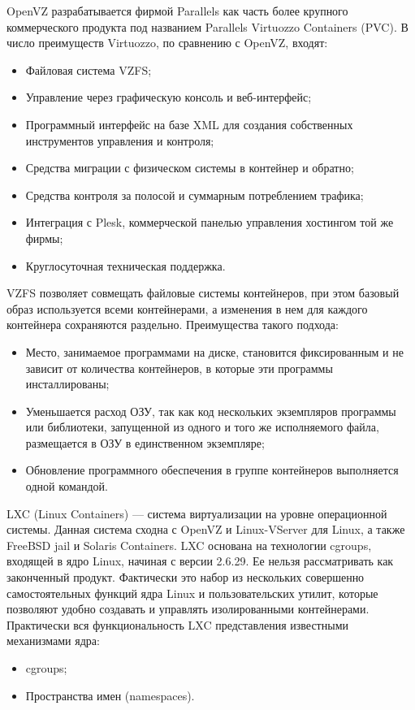 OpenVZ разрабатывается фирмой Parallels как часть более крупного коммерческого продукта под названием Parallels Virtuozzo Containers (PVC). В число преимуществ Virtuozzo, по сравнению с OpenVZ, входят:
\begin{itemize}
  \item Файловая система VZFS;
  \item Управление через графическую консоль и веб-интерфейс;
  \item Программный интерфейс на базе XML для создания собственных инструментов управления и контроля;
  \item Средства миграции с физическом системы в контейнер и обратно;
  \item Средства контроля за полосой и суммарным потреблением трафика;
  \item Интеграция с Plesk, коммерческой панелью управления хостингом той же фирмы;
  \item Круглосуточная техническая поддержка.
\end{itemize}

VZFS позволяет совмещать файловые системы контейнеров, при этом базовый образ используется всеми контейнерами, а изменения в нем для каждого контейнера сохраняются раздельно.
Преимущества такого подхода:
\begin{itemize}
  \item Место, занимаемое программами на диске, становится фиксированным и не зависит от количества контейнеров, в которые эти программы инсталлированы;
  \item Уменьшается расход ОЗУ, так как код нескольких экземпляров программы или библиотеки, запущенной из одного и того же исполняемого файла, размещается в ОЗУ в единственном экземпляре;
  \item Обновление программного обеспечения в группе контейнеров выполняется одной командой.
\end{itemize}

LXC (Linux Containers) --- система виртуализации на уровне операционной системы.
Данная система сходна с OpenVZ и Linux-VServer для Linux, а также FreeBSD jail и Solaris Containers.
LXC основана на технологии cgroups, входящей в ядро Linux, начиная с версии 2.6.29.
Ее нельзя рассматривать как законченный продукт.
Фактически это набор из нескольких совершенно самостоятельных функций ядра Linux и пользовательских утилит, которые позволяют удобно создавать и управлять изолированными контейнерами.
Практически вся функциональность LXC представления известными механизмами ядра:
\begin{itemize}
  \item cgroups;
  \item Пространства имен (namespaces).
\end{itemize}

